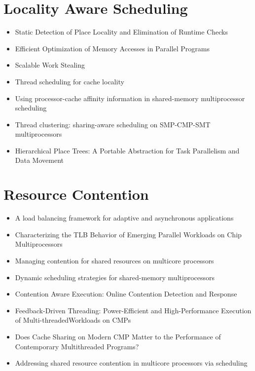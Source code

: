 \section{Locality Aware Scheduling}
\label{sec:lr-locality-aware-scheduling}

\begin{itemize}
\item Static Detection of Place Locality and Elimination of Runtime
  Checks \cite{Agarwal2008}
\item Efficient Optimization of Memory Accesses in Parallel Programs
  \cite{Barik2009}
\item Scalable Work Stealing \cite{Dinan2009}
\item Thread scheduling for cache locality \cite{Philbin1996}
\item Using processor-cache affinity information in shared-memory
  multiprocessor scheduling \cite{Squillante1993}
\item Thread clustering: sharing-aware scheduling on SMP-CMP-SMT
  multiprocessors \cite{Tam2007}
\item Hierarchical Place Trees: A Portable Abstraction for Task
  Parallelism and Data Movement \cite{Yan2009}
\end{itemize}


\section{Resource Contention}
\label{sec:lr-resource-contention}

\begin{itemize}
\item A load balancing framework for adaptive and asynchronous
  applications \cite{Barker2004}
\item Characterizing the TLB Behavior of Emerging Parallel Workloads
  on Chip Multiprocessors \cite{Bhattacharjee2009}
\item Managing contention for shared resources on multicore processors
  \cite{Fedorova2010}
\item Dynamic scheduling strategies for shared-memory multiprocessors
  \cite{Hamidzadeh1996}
\item Contention Aware Execution: Online Contention Detection and
  Response \cite{Soffa2010}
\item Feedback-Driven Threading: Power-Efficient and High-Performance
  Execution of Multi-threadedWorkloads on CMPs \cite{Suleman2008}
\item Does Cache Sharing on Modern CMP Matter to the Performance of
  Contemporary Multithreaded Programs? \cite{Zhang2010}
\item Addressing shared resource contention in multicore processors
  via scheduling \cite{Zhuravlev2010}
\end{itemize}


